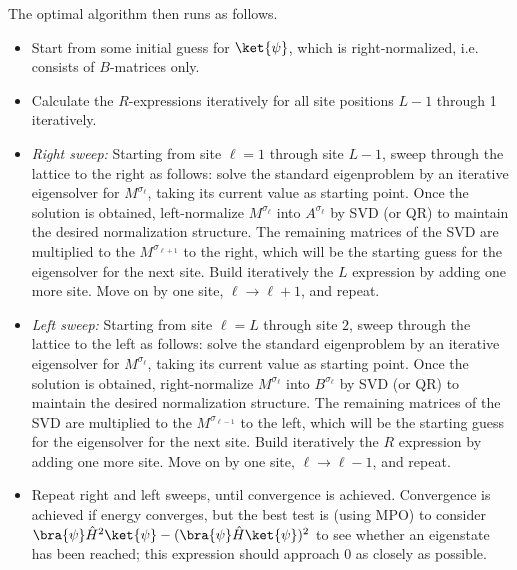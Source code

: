 The optimal algorithm then runs as follows. 
\begin{itemize}
\item Start from some initial guess for $\ket{\psi}$, which is right-normalized, i.e. consists of $B$-matrices only. 
\item Calculate the $R$-expressions iteratively for all site positions $L-1$ through 1 iteratively.
\item {\em Right sweep:} Starting from site $\ell=1$ through site $L-1$, sweep through the lattice to the right as follows: solve the standard eigenproblem by an iterative eigensolver for $M^{\sigma_\ell}$, taking its current value as starting point. Once the solution is obtained, left-normalize $M^{\sigma_\ell}$ into $A^{\sigma_\ell}$ by SVD (or QR) to maintain the desired normalization structure. The remaining matrices of the SVD are multiplied to the $M^{\sigma_{\ell+1}}$ to the right, which will be the starting guess for the eigensolver for the next site. Build iteratively the $L$ expression by adding one more site. Move on by one site, $\ell \rightarrow \ell+1$, and repeat.
\item {\em Left sweep:} Starting from site $\ell=L$ through site $2$, sweep through the lattice to the left as follows: solve the standard eigenproblem by an iterative eigensolver for $M^{\sigma_\ell}$, taking its current value as starting point. Once the solution is obtained, right-normalize $M^{\sigma_\ell}$ into $B^{\sigma_\ell}$ by SVD (or QR) to maintain the desired normalization structure. The remaining matrices of the SVD are multiplied to the $M^{\sigma_{\ell-1}}$ to the left, which will be the starting guess for the eigensolver for the next site. Build iteratively the $R$ expression by adding one more site. Move on by one site, $\ell \rightarrow \ell-1$, and repeat.
\item Repeat right and left sweeps, until convergence is achieved. Convergence is achieved if energy converges, but the best test is (using MPO) to consider
$\bra{\psi} \hat{H}^2 \ket{\psi} - (\bra{\psi} \hat{H} \ket{\psi})^2$ to see whether an eigenstate has been reached; this expression should approach 0 as closely as possible.
\end{itemize}

